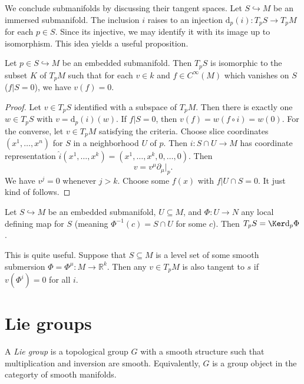
We conclude submanifolds by discussing their tangent spaces. Let $S\hookrightarrow M$ be an immersed submanifold. The inclusion $i$ raises to an injection $\mathrm{d} _p(i): T_pS \to T_pM$ for each $p\in S$. Since its injective, we may identify it with its image up to isomorphism. This idea yields a useful proposition.

\begin{proposition}\label{2.1.13}
	Let $p\in S\hookrightarrow M$ be an embedded submanifold. Then $T_pS$ is isomorphic to the subset $K$ of $T_pM$ such that for each $v\in k$ and $f\in C^\infty (M)$ which vanishes on $S$ ($f|S=0$), we have $v(f)=0$.
\end{proposition}
\begin{proof}
	Let $v\in T_pS$ identified with a subspace of $T_pM$. Then there is exactly one $w\in T_pS$ with $v=\mathrm{d}_p(i)(w)$. If $f|S=0$, then $v(f)=w(f\circ i)=w(0)$. For the converse, let $v\in T_pM$ satisfying the criteria. Choose slice coordinates $(x^1, \ldots ,x^n)$ for $S$ in a neighborhood $U$ of $p$. Then $i : S \cap U\to M$ has coordinate representation $\hat{i} (x^1, \ldots ,x^k)=(x^1, \ldots ,x^k,0, \ldots ,0)$. Then
	\[
		v=v^\mu \partial _\mu |_p
	.\]
	We have $v^j=0$ whenever $j>k$. Choose some $f(x)$ with $f|U \cap S=0$. It just kind of follows.
\end{proof}


\begin{corollary}\label{2.1.14}
	Let $S\hookrightarrow M$ be an embedded submanifold, $U\subseteq M$, and $\Phi : U \to N$ any local defining map for $S$ (meaning $\Phi ^{-1} (c)=S \cap U$ for some $c$). Then $T_pS= \Ker \mathrm{d}_p\Phi $.
\end{corollary}

This is quite useful. Suppose that $S\subseteq M$ is a level set of some smooth submersion $\Phi =\Phi ^\mu : M \to \mathbb{R} ^k$. Then any $v\in T_pM$ is also tangent to $s$ if $v(\Phi ^i)=0$ for all $i$.

\chapter{Lie groups}

\begin{definition}\label{3.0.1}
	A \emph{Lie group} is a topological group $G$ with a smooth structure such that multiplication and inversion are smooth. Equivalently, $G$ is a group object in the categorty of smooth manifolds.
\end{definition}

